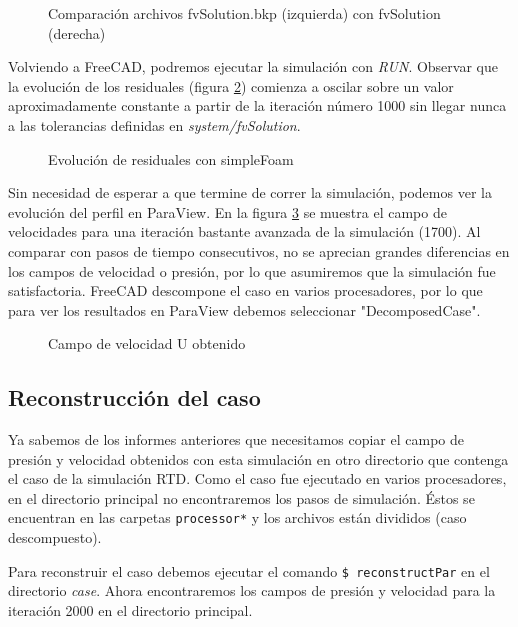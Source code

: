 \documentclass[oneside,a4paper,spanish,links]{amca}
\begin{document}
\begin{figure}[htb]
		 \caption{Comparación archivos fvSolution.bkp (izquierda) con fvSolution (derecha)} \label{fg:meld}
\end{figure}

Volviendo a FreeCAD, podremos ejecutar la simulación con \textit{RUN}. Observar que la evolución de los residuales (figura \ref{fg:03_sf_residuales}) comienza a oscilar sobre un valor aproximadamente constante a partir de la iteración número 1000 sin llegar nunca a las tolerancias definidas en \textit{system/fvSolution}. 

\begin{figure}[htb]
	\caption{Evolución de residuales con simpleFoam} \label{fg:03_sf_residuales}
\end{figure}

Sin necesidad de esperar a que termine de correr la simulación, podemos ver la evolución del perfil en ParaView. En la figura \ref{fg:03_sf_U} se muestra el campo de velocidades para una iteración bastante avanzada de la simulación (1700). Al comparar con pasos de tiempo consecutivos, no se aprecian grandes diferencias en los campos de velocidad o presión, por lo que asumiremos que la simulación fue satisfactoria.
FreeCAD descompone el caso en varios procesadores, por lo que para ver los resultados en ParaView debemos seleccionar "DecomposedCase".

\begin{figure}[htb]
	\caption{Campo de velocidad U obtenido} \label{fg:03_sf_U}
\end{figure}

\subsection{Reconstrucción del caso}
Ya sabemos de los informes anteriores que necesitamos copiar el campo de presión y velocidad obtenidos con esta simulación en otro directorio que contenga el caso de la simulación RTD. Como el caso fue ejecutado en varios procesadores, en el directorio principal no encontraremos los pasos de simulación. Éstos se encuentran en las carpetas \texttt{processor*} y los archivos están divididos (caso descompuesto).

Para reconstruir el caso debemos ejecutar el comando \texttt{\$ reconstructPar} en el directorio \textit{case}. Ahora encontraremos los campos de presión y velocidad para la iteración 2000 en el directorio principal.
\end{document}
